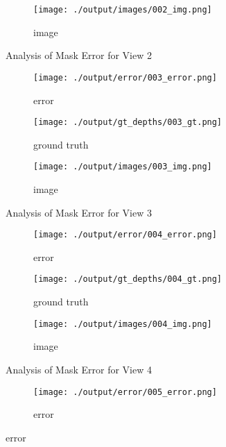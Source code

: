 \documentclass{article}
\begin{document}
\begin{figure}
\begin{subfigure}{0.3\textwidth}
		\centering
		\texttt{[image: ./output/images/002\_img.png]}
		\caption{image}
		\label{fig:img2}
	\end{subfigure}
	\hfill
	\caption{Analysis of Mask Error for View 2}
	\label{fig:error_analys2}
\end{figure}\begin{figure}
	\centering
	\begin{subfigure}{0.3\textwidth}
		\centering
		\texttt{[image: ./output/error/003\_error.png]}
		\caption{error}
		\label{fig:error3}
	\end{subfigure}
	\hfill
	\centering
	\begin{subfigure}{0.3\textwidth}
		\centering
		\texttt{[image: ./output/gt\_depths/003\_gt.png]}
		\caption{ground truth}
		\label{fig:gt3}
	\end{subfigure}
	\hfill
	\centering
	\begin{subfigure}{0.3\textwidth}
		\centering
		\texttt{[image: ./output/images/003\_img.png]}
		\caption{image}
		\label{fig:img3}
	\end{subfigure}
	\hfill
	\caption{Analysis of Mask Error for View 3}
	\label{fig:error_analys3}
\end{figure}\begin{figure}
	\centering
	\begin{subfigure}{0.3\textwidth}
		\centering
		\texttt{[image: ./output/error/004\_error.png]}
		\caption{error}
		\label{fig:error4}
	\end{subfigure}
	\hfill
	\centering
	\begin{subfigure}{0.3\textwidth}
		\centering
		\texttt{[image: ./output/gt\_depths/004\_gt.png]}
		\caption{ground truth}
		\label{fig:gt4}
	\end{subfigure}
	\hfill
	\centering
	\begin{subfigure}{0.3\textwidth}
		\centering
		\texttt{[image: ./output/images/004\_img.png]}
		\caption{image}
		\label{fig:img4}
	\end{subfigure}
	\hfill
	\caption{Analysis of Mask Error for View 4}
	\label{fig:error_analys4}
\end{figure}\begin{figure}
	\centering
	\begin{subfigure}{0.3\textwidth}
		\centering
		\texttt{[image: ./output/error/005\_error.png]}
		\caption{error}
		\label{fig:error5}
	\end{subfigure}

\end{figure}
\end{document}
